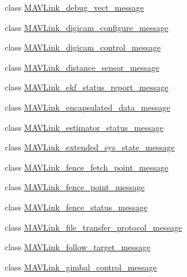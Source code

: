 \begin{DoxyCompactItemize}
class \hyperlink{classpymavlink_1_1dialects_1_1v10_1_1MAVLink__debug__vect__message}{M\+A\+V\+Link\+\_\+debug\+\_\+vect\+\_\+message}
\item 
class \hyperlink{classpymavlink_1_1dialects_1_1v10_1_1MAVLink__digicam__configure__message}{M\+A\+V\+Link\+\_\+digicam\+\_\+configure\+\_\+message}
\item 
class \hyperlink{classpymavlink_1_1dialects_1_1v10_1_1MAVLink__digicam__control__message}{M\+A\+V\+Link\+\_\+digicam\+\_\+control\+\_\+message}
\item 
class \hyperlink{classpymavlink_1_1dialects_1_1v10_1_1MAVLink__distance__sensor__message}{M\+A\+V\+Link\+\_\+distance\+\_\+sensor\+\_\+message}
\item 
class \hyperlink{classpymavlink_1_1dialects_1_1v10_1_1MAVLink__ekf__status__report__message}{M\+A\+V\+Link\+\_\+ekf\+\_\+status\+\_\+report\+\_\+message}
\item 
class \hyperlink{classpymavlink_1_1dialects_1_1v10_1_1MAVLink__encapsulated__data__message}{M\+A\+V\+Link\+\_\+encapsulated\+\_\+data\+\_\+message}
\item 
class \hyperlink{classpymavlink_1_1dialects_1_1v10_1_1MAVLink__estimator__status__message}{M\+A\+V\+Link\+\_\+estimator\+\_\+status\+\_\+message}
\item 
class \hyperlink{classpymavlink_1_1dialects_1_1v10_1_1MAVLink__extended__sys__state__message}{M\+A\+V\+Link\+\_\+extended\+\_\+sys\+\_\+state\+\_\+message}
\item 
class \hyperlink{classpymavlink_1_1dialects_1_1v10_1_1MAVLink__fence__fetch__point__message}{M\+A\+V\+Link\+\_\+fence\+\_\+fetch\+\_\+point\+\_\+message}
\item 
class \hyperlink{classpymavlink_1_1dialects_1_1v10_1_1MAVLink__fence__point__message}{M\+A\+V\+Link\+\_\+fence\+\_\+point\+\_\+message}
\item 
class \hyperlink{classpymavlink_1_1dialects_1_1v10_1_1MAVLink__fence__status__message}{M\+A\+V\+Link\+\_\+fence\+\_\+status\+\_\+message}
\item 
class \hyperlink{classpymavlink_1_1dialects_1_1v10_1_1MAVLink__file__transfer__protocol__message}{M\+A\+V\+Link\+\_\+file\+\_\+transfer\+\_\+protocol\+\_\+message}
\item 
class \hyperlink{classpymavlink_1_1dialects_1_1v10_1_1MAVLink__follow__target__message}{M\+A\+V\+Link\+\_\+follow\+\_\+target\+\_\+message}
\item 
class \hyperlink{classpymavlink_1_1dialects_1_1v10_1_1MAVLink__gimbal__control__message}{M\+A\+V\+Link\+\_\+gimbal\+\_\+control\+\_\+message}

\end{DoxyCompactItemize}
